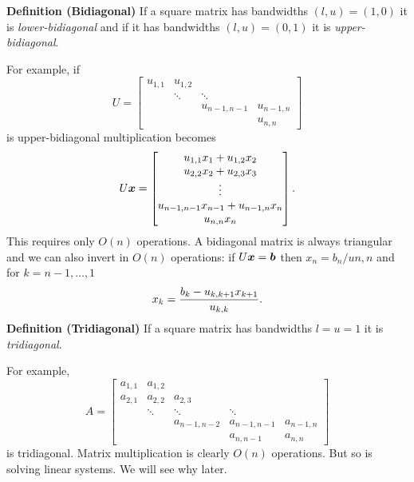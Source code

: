 \textbf{Definition (Bidiagonal)} If a square matrix has bandwidths $(l,u) = (1,0)$ it is \emph{lower-bidiagonal} and if it has bandwidths $(l,u) = (0,1)$ it is \emph{upper-bidiagonal}. 

For example, if
\[
U = \begin{bmatrix} u_{1,1} & u_{1,2} \\ & \ensuremath{\ddots} & \ensuremath{\ddots} \\
&&                                 u_{n-1,n-1} & u_{n-1,n} \\
&&& u_{n,n}
\end{bmatrix}
\]
is upper-bidiagonal multiplication becomes
\[
U\bm{{\mbox{\boldmath$x$\unboldmath}}} = \begin{bmatrix} u_{1,1} x_1 + u_{1,2} x_2 \\ u_{2,2} x_2 + u_{2,3} x_3  \\ \vdots \\ u_{n-1,n-1} x_{n-1} + u_{n-1,n} x_n \\u_{n,n} x_n \end{bmatrix}.
\]
This requires only $O(n)$ operations. A bidiagonal matrix is always triangular and we can also invert in $O(n)$ operations: if $U \bm{{\mbox{\boldmath$x$\unboldmath}}} = \bm{{\mbox{\boldmath$b$\unboldmath}}}$ then $x_n = b_n/u{n,n}$ and for $k = n-1,\ensuremath{\ldots},1$
\[
x_k = {b_k - u_{k,k+1} x_{k+1} \over u_{k,k}}.
\]
\textbf{Definition (Tridiagonal)} If a square matrix has bandwidths $l = u = 1$ it is \emph{tridiagonal}.

For example, 
\[
A = \begin{bmatrix} a_{1,1} & a_{1,2} \\
a_{2,1} & a_{2,2} & a_{2,3} \\
 & \ensuremath{\ddots} & \ensuremath{\ddots} & \ensuremath{\ddots} \\
&& a_{n-1,n-2} &                                 a_{n-1,n-1} & a_{n-1,n} \\
&&&a_{n,n-1} & a_{n,n}
\end{bmatrix}
\]
is tridiagonal. Matrix multiplication is clearly $O(n)$ operations. But so is solving linear systems.  We will see why later. 



